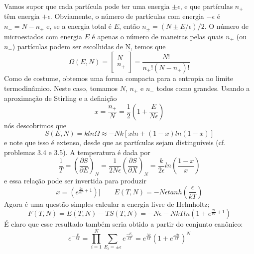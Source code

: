 \documentclass[12pt]{article}
\begin{document}
Vamos supor que cada partícula pode ter uma energia $\pm \epsilon$, e que partículas $n_{+}$ têm energia $+\epsilon$. Obviamente, o número de partículas com energia $-\epsilon$ é $n_{-} = N - n_{+}$ e, se a energia total é $E$, então $n_{\pm} = (N \pm E/\epsilon)/2$. O número de microestados com energia $E$ é apenas o número de maneiras pelas quais $n_{+}$ (ou $n_{-}$) partículas podem ser escolhidas de N, temos que
\begin{equation}
\Omega(E, N) =  \begin{bmatrix}
N   \\
n_{+}  \end{bmatrix}  = \frac{N!}{n_{+}!(N - n_{+})!}
\end{equation}
Como de costume, obtemos uma forma compacta para a entropia no limite termodinâmico. Neste caso, tomamos $N$, $n_{+}$ e $n_{-}$ todos como grandes. Usando a aproximação de Stirling e a definição
\begin{equation}
x = \frac{n_{+}}{N} = \frac{1}{2}\left(1 + \frac{E}{N \epsilon} \right)
\end{equation}
nós descobrimos que
\begin{equation}
S(E,N) = k ln \Omega \approx - Nk\left[xln + (1-x)ln(1-x) \right]
\end{equation}
e note que isso é extenso, desde que as partículas sejam distinguíveis (cf. problemas 3.4 e 3.5). A temperatura é dada por
\begin{equation}
\frac{1}{T} = \left(\frac{\partial S}{\partial E} \right)_{N} = \frac{1}{2 N \epsilon} \left(\frac{\partial S}{\partial X} \right)_{N} = \frac{k}{2 \epsilon} ln \left( \frac{1-x}{x}\right)
\end{equation}
e essa relação pode ser invertida para produzir
\begin{equation}
    x = (e^{\frac{2 \epsilon}{kT} + 1}) ] \qquad E(T, N) = -N \epsilon tanh\left(\frac{\epsilon}{kT} \right)
\end{equation}
Agora é uma questão simples calcular a energia livre de Helmholtz;
\begin{equation}
    F(T, N) = E(T ,N) - TS(T, N) = -N\epsilon -NkTln\left(1+e^{\frac{2 \epsilon}{kT} + 1}\right)
\end{equation}
É claro que esse resultado também seria obtido a partir do conjunto canônico:
\begin{equation}
    e^{-\frac{F}{kT}} = \prod_{i=1}^{N} \sum_{E_{i} = \pm \epsilon} e^{\frac{-E_{i}}{kT}} = e^{\frac{N \epsilon}{kT}} \left(1 + e^{\frac{-2\epsilon}{kT}} \right)^{N}
\end{equation}
\end{document}

